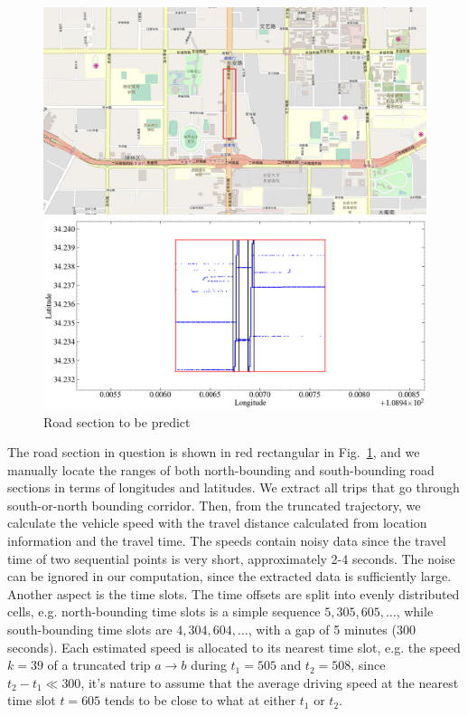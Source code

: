 \documentclass[5pt]{article}
\numberwithin{table}{section}
\begin{document}
\begin{figure}[!h]
\centering
\begin{minipage}{0.45\linewidth}
\includegraphics[width=\textwidth]{figs/XiAn}
\end{minipage}
\begin{minipage}{0.45\linewidth}
\includegraphics[width=\textwidth]{figs/lnglat}
\end{minipage}
\caption{Road section to be predict} 
\label{fig:roadsection}
\end{figure}

The road section in question is shown in red rectangular in Fig.~\ref{fig:roadsection}, and we manually locate the ranges of both north-bounding and south-bounding road sections in terms of longitudes and latitudes. We extract all trips that go through south-or-north bounding corridor. Then, from the truncated trajectory, we calculate the vehicle speed with the travel distance calculated from location information and the travel time. The speeds contain noisy data since the travel time of two sequential points is very short, approximately 2-4 seconds. The noise can be ignored in our computation, since the extracted data is sufficiently large. Another aspect is the time slots. The time offsets are split into evenly distributed cells, e.g. north-bounding time slots is a simple sequence $5, 305, 605,\ldots$, while south-bounding time slots are $4, 304, 604, \ldots$, with a gap of 5 minutes (300 seconds). Each estimated speed is allocated to its nearest time slot, e.g. the speed $k=39$ of a truncated trip $a\to b$ during $t_1=505$ and $t_2=508$, since $t_2-t_1\ll 300$, it's nature to assume that the average driving speed at the nearest time slot $t=605$ tends to be close to what at either $t_1$ or $t_2$.
\end{document}
